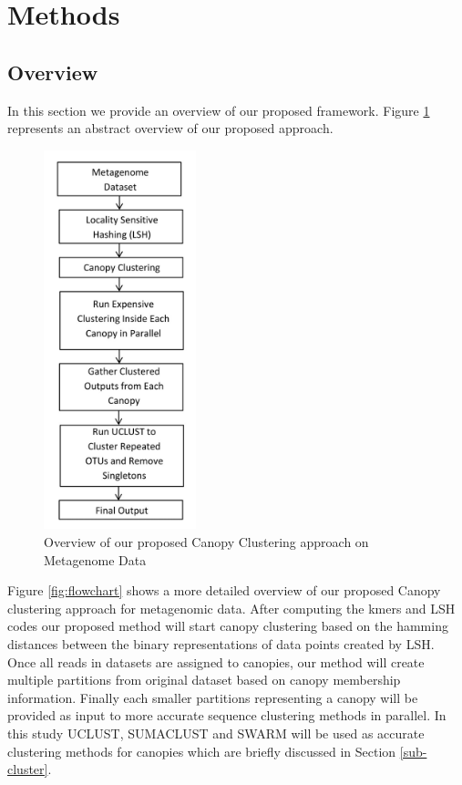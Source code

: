 \documentclass[10pt, conference, compsocconf]{IEEEtran}
\begin{document}
\section{Methods}
\label{featMethod}
\subsection{Overview}
In this section we provide an overview of our proposed framework. Figure \ref{fig:overall} represents an abstract overview of our proposed approach.

\begin{figure}
	\centering
	\includegraphics[width=0.5\linewidth,height=11cm]{overall.jpg}	
	\caption{Overview of our proposed Canopy Clustering approach on Metagenome Data}
	\label{fig:overall}
\end{figure} 

Figure \ref{fig:flowchart} shows a more detailed overview of our proposed Canopy clustering approach for metagenomic data. After computing the kmers and LSH codes our proposed method will start canopy clustering based on the hamming distances between the binary representations of data points created by LSH. Once all reads in datasets are assigned to canopies, our method will create multiple partitions from original dataset based on canopy membership information. Finally each smaller partitions representing a canopy will be provided as input to more accurate sequence clustering methods in parallel. In this study UCLUST, SUMACLUST and SWARM will be used as accurate clustering methods for canopies which are briefly discussed in Section \ref{sub-cluster}.
\end{document}
